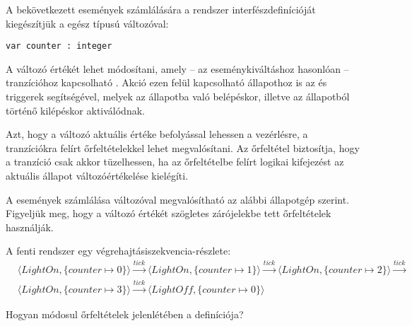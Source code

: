 \begin{megjegyzes}
A bekövetkezett  események számlálására a rendszer interfészdefinícióját kiegészítjük a  egész típusú változóval:

\begin{lstlisting}
var counter : integer
\end{lstlisting}
\end{megjegyzes}

A változó értékét  lehet módosítani, amely -- az eseménykiváltáshoz hasonlóan -- tranzícióhoz kapcsolható . Akció ezen felül kapcsolható állapothoz is az  és  triggerek segítségével, melyek az állapotba való belépéskor, illetve az állapotból történő kilépéskor aktiválódnak.

Azt, hogy a változó aktuális értéke befolyással lehessen a vezérlésre, a tranzíciókra felírt őrfeltételekkel lehet megvalósítani. Az őrfeltétel biztosítja, hogy a tranzíció csak akkor tüzelhessen, ha az őrfeltételbe felírt logikai kifejezést az aktuális állapot változóértékelése kielégíti.

\begin{megjegyzes}
A  események számlálása változóval megvalósítható az alábbi állapotgép szerint. Figyeljük meg, hogy a változó értékét szögletes zárójelekbe tett őrfeltételek használják.

\end{megjegyzes}

\begin{megjegyzes}
A fenti rendszer egy végrehajtásiszekvencia-részlete:
\begin{align*}
& \langle \mathit{LightOn}, \{ \mathit{counter} \mapsto 0 \} \rangle \xrightarrow{\mathit{tick}}
  \langle \mathit{LightOn}, \{ \mathit{counter} \mapsto 1 \} \rangle \xrightarrow{\mathit{tick}}
  \langle \mathit{LightOn}, \{ \mathit{counter} \mapsto 2 \} \rangle \xrightarrow{\mathit{tick}} \\
& \langle \mathit{LightOn}, \{ \mathit{counter} \mapsto 3 \} \rangle \xrightarrow{\mathit{tick}}
  \langle \mathit{LightOff}, \{ \mathit{counter} \mapsto 0 \} \rangle
\end{align*}

\end{megjegyzes}

\begin{feladat}
Hogyan módosul őrfeltételek jelenlétében a  definíciója?
\end{feladat}

